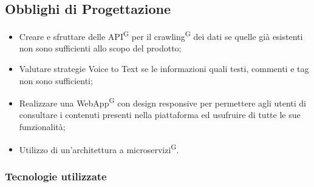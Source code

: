 \subsection{Obblighi di Progettazione}

\begin{itemize}
  \item Creare e sfruttare delle API\textsuperscript{G} per il crawling\textsuperscript{G} dei dati se quelle già esistenti non sono sufficienti allo scopo del prodotto;
  \item Valutare strategie Voice to Text se le informazioni quali testi, commenti e tag non sono sufficienti;
  \item Realizzare una WebApp\textsuperscript{G} con design responsive per permettere agli utenti di consultare i contenuti presenti nella piattaforma ed usufruire di tutte le sue funzionalità;
  \item Utilizzo di un'architettura a microservizi\textsuperscript{G}{}.
\end{itemize}

\subsubsection{Tecnologie utilizzate}

